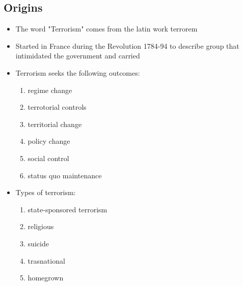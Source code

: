 \documentclass{article}
\begin{document}
\subsection{Origins}
\begin{itemize}
\item The word "Terrorism" comes from the latin work terrorem
\item Started in France during the Revolution 1784-94 to describe
  group that intimidated the government and carried
\item Terrorism seeks the following outcomes:
  \begin{enumerate}
    \item regime change
    \item terrotorial controls
    \item territorial change
    \item policy change
    \item social control
    \item status quo maintenance
  \end{enumerate}
\item Types of terrorism:
  \begin{enumerate}
    \item state-sponsored terrorism
    \item religious
    \item suicide
    \item trasnational
    \item homegrown
  \end{enumerate}
\end{itemize}
\end{document}

